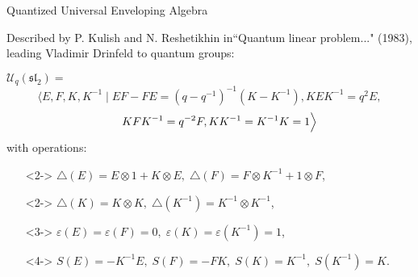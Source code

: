 \documentclass{beamer}
\newcommand\1{_{(1)}}
\newcommand\2{_{(2)}}
\begin{document}
\begin{frame}{Quantized Universal Enveloping Algebra}


Described by P. Kulish and N. Reshetikhin in``Quantum linear problem..." (1983), leading Vladimir Drinfeld to quantum groups:

$\mathcal{U}_q(\mathfrak{sl}
_2)=$
\[
\Big\langle E,F,K,K^{-1}\;\vert\;EF-FE=(q-q^{-1})^{-1}\left(K-K^{-1}\right), KEK^{-1}=q^2 E, \]\[\hspace{4ex}KFK^{-1}=q^{-2}F, KK^{-1}=K^{-1}K=1\Big\rangle
\]
with operations:
\vspace{0.5ex}
\begin{itemize}
\setlength{\itemsep}{1.5ex}
    \item[]<2-> $\triangle(E)=E\otimes 1+K\otimes E,\; \triangle(F)=F\otimes K^{-1}+ 1\otimes F$, \item[]<2-> $\triangle(K)=K\otimes K,\; \triangle(K^{-1})=K^{-1}\otimes K^{-1}$,
    \item[]<3-> $\varepsilon(E)=\varepsilon(F)=0,\; \varepsilon(K)=\varepsilon(K^{-1})=1$,
    \item[]<4-> $S(E)=-K^{-1}E,\; S(F)=-F K, \;S(K)=K^{-1},\; S(K^{-1})=K$.
\end{itemize}


\end{frame}
\end{document}
